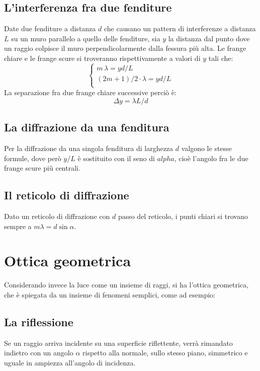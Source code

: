 \documentclass{article}
\begin{document}
\subsection{L'interferenza fra due fenditure}
Date due fenditure a distanza $d$ che causano un pattern di interferenze a distanza $L$ su un muro parallelo a quello delle fenditure, sia $y$ la distanza dal punto dove un raggio colpisce il muro perpendicolarmente dalla fessura più alta.
Le frange chiare e le frange scure si troveranno rispettivamente a valori di $y$ tali che:
\begin{equation}
    \begin{cases}
        m\,\lambda=yd/L\\
        (2m+1)/2 \cdot\lambda=yd/L\\
    \end{cases}
\end{equation}
La separazione fra due frange chiare successive perciò è:
\begin{equation}
    \Delta y = \lambda L/d
\end{equation}

\subsection{La diffrazione da una fenditura}
Per la diffrazione da una singola fenditura di larghezza $d$ valgono le stesse formule, dove però $y/L$ è sostituito con il seno di $alpha$, cioè l'angolo fra le due frange scure più centrali.

\subsection{Il reticolo di diffrazione}
Dato un reticolo di diffrazione con $d$ passo del reticolo, i punti chiari si trovano sempre a $m\lambda=d\sin{\alpha}$.


\section{Ottica geometrica}
Considerando invece la luce come un insieme di raggi, si ha l'ottica geometrica, che è spiegata da un insieme di fenomeni semplici, come ad esempio:

\subsection{La riflessione}
Se un raggio arriva incidente su una superficie riflettente, verrà rimandato indietro con un angolo $\alpha$ rispetto alla normale, sullo stesso piano, simmetrico e uguale in ampiezza all'angolo di incidenza.
\end{document}
